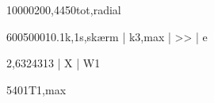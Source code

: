\documentclass[a4paper,oneside,10pt,danish]{report}
\begin{document}
\begin{HV-lækstrøm-pr-fase}{10000}{20}{0,44}{50}{tot,radial}
\end{HV-lækstrøm-pr-fase}


\begin{KB-kontrol-strøm}{600}{5000}{1}{0.1}{k,1s,skærm | k3,max | >> | e }
\end{KB-kontrol-strøm}

\begin{KB-kontrol-energi}{2,6}{3}{243}{13}{  | X | W1 }
\end{KB-kontrol-energi}

\begin{3f-2f}{540}{1}{T1,max}
\end{3f-2f}
\end{document}
